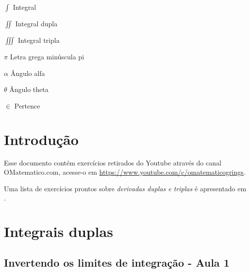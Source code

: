 \documentclass[
	12pt,				%
	openright,			%
	twoside,			%
	a4paper,			%
	english,			%
	french,				%
	spanish,			%
	brazil,				%
]{abntex2}
\begin{document}
\begin{simbolos}
	\item[$ \displaystyle\int $] Integral
	\item[$ \displaystyle\iint $] Integral dupla
	\item[$ \displaystyle\iiint $] Integral tripla
	\item[$ \pi $] Letra grega minúscula pi
	\item[$ \alpha $] Ângulo alfa
	\item[$ \theta $] Ângulo theta
	\item[$ \in $] Pertence
\end{simbolos}

\tableofcontents*
\cleardoublepage


\textual

\chapter*[Introdução]{Introdução}

Esse documento contém exercícios retirados do Youtube através do canal OMatematico.com, acesse-o em \url{https://www.youtube.com/c/omatematicogrings}. 

Uma lista de exercícios prontos sobre \emph{derivadas duplas e triplas} é apresentado em .


\chapter{Integrais duplas}\label{integrais_duplas}

\section{Invertendo os limites de integração - Aula 1}			
			
\end{document}
